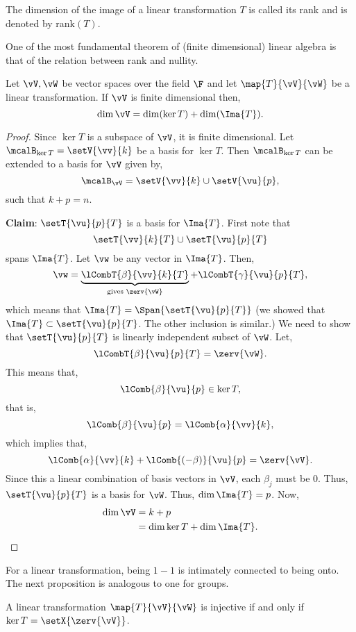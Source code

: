 \begin{Definition}[name=Rank]
    The dimension of the image of a linear transformation $T$ is called its rank and is denoted by rank$(T)$.
\end{Definition}
One of the most fundamental theorem of (finite dimensional) linear algebra is that of the relation between
rank and nullity. 
\begin{Theorem}[name=Dimension theorem]
    Let $\vV,\vW$ be vector spaces over the field $\F$ and let $\map{T}{\vV}{\vW}$ be a linear transformation.
    If $\vV$ is finite dimensional then,
    \[\dim{\vV} = \dim(\ker{T}) + \dim(\Ima{T}).\]
\end{Theorem}
\begin{proof}
    Since $\ker{T}$ is a subspace of $\vV$, it is finite dimensional. Let $\mcalB_{\ker{T}} = \setV{\vv}{k}$
    be a basis for $\ker{T}$. Then $\mcalB_{\ker{T}}$ can be extended to a basis for $\vV$ given by,
    \[\mcalB_{\vV} = \setV{\vv}{k} \cup \setV{\vu}{p},\]
    such that $k + p = n$.

    \textbf{Claim}: $\setT{\vu}{p}{T}$ is a basis for $\Ima{T}$.
    First note that \[\setT{\vv}{k}{T} \cup \setT{\vu}{p}{T}\] spans $\Ima{T}$. 
    Let $\vw$ be any vector in
    $\Ima{T}$. Then,
    \[\vw = \underbrace{\lCombT{\beta}{\vv}{k}{T}}_{\text{gives $\zerv{\vW}$}} + \lCombT{\gamma}{\vu}{p}{T},\]
    which means that 
    $\Ima{T} = \Span{\setT{\vu}{p}{T}}$ (we showed that $\Ima{T} \subset \setT{\vu}{p}{T}$. The other
    inclusion is similar.)
    We need to show that $\setT{\vu}{p}{T}$ is linearly independent subset of $\vW$.
    Let,
    \[\lCombT{\beta}{\vu}{p}{T} = \zerv{\vW}. \]
    This means that,
    \[\lComb{\beta}{\vu}{p} \in \ker{T},\]
    that is,
    \[\lComb{\beta}{\vu}{p} = \lComb{\alpha}{\vv}{k},\]
    which implies that,
    \[\lComb{\alpha}{\vv}{k} + \lComb{(-\beta)}{\vu}{p} = \zerv{\vV}.\]
    Since this a linear combination of basis vectors in $\vV$, each $\beta_j$ must be $0$. Thus,
    $\setT{\vu}{p}{T}$ is a basis for $\vW$. Thus, $\dim{\Ima{T}} = p$.
    Now,
    \begin{align*}
	\dim{\vV} &= k + p \\
	& = \dim{\ker{T}} + \dim{\Ima{T}}.
    \end{align*}
\end{proof}
For a linear transformation, being $1-1$ is intimately connected to being onto. The next proposition is
analogous to one for groups.
\begin{Proposition}
    A linear transformation $\map{T}{\vV}{\vW}$ is injective if and only if $\ker{T} = \setX{\zerv{\vV}}$.
\end{Proposition}
